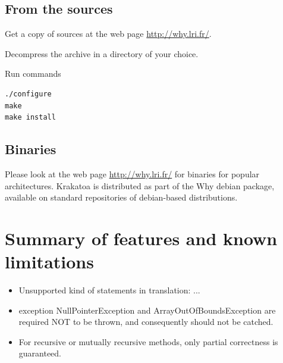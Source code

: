 \documentclass[a4paper,11pt,twoside,openright]{report}
\begin{document}
\subsection{From the sources}

Get a copy of sources at the web page \url{http://why.lri.fr/}. 

Decompress the archive in a directory of your choice.

Run commands
\begin{verbatim}
./configure
make
make install
\end{verbatim}

\subsection{Binaries}

Please look at the web page \url{http://why.lri.fr/} for binaries for
popular architectures. Krakatoa is distributed as part of the Why
debian package, available on standard repositories of debian-based
distributions.
 
\section{Summary of features and known limitations}
\label{sec:features}

\begin{itemize}

\item Unsupported kind of statements in translation: ...

\item exception NullPointerException and ArrayOutOfBoundsException are
required NOT to be thrown, and consequently should not be catched.


\item For recursive or mutually recursive methods, only partial
correctness is guaranteed.

\end{itemize}
\end{document}
